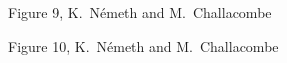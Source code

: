 \twolinestyle{\documentclass[prb,preprint]{revtex4}}
\begin{document}
{\clearpage

\begin{center}
Figure 9, K.~N\'emeth and M.~Challacombe \\[1.cm]
\end{center}

\clearpage

\begin{center}
Figure 10, K.~N\'emeth and M.~Challacombe \\[1.cm]
\end{center}


}
\end{document}
